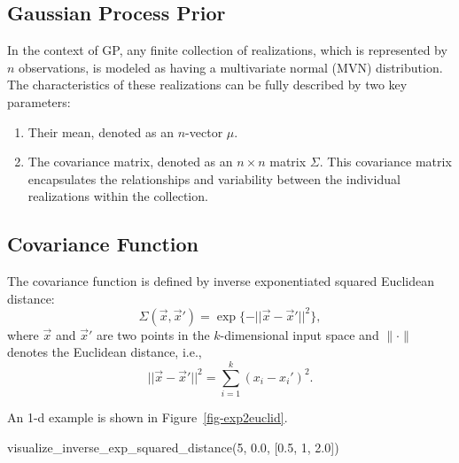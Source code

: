 \documentclass[
  letterpaper,
  DIV=11,
  numbers=noendperiod]{scrreprt}
\newenvironment{Shaded}{\begin{snugshade}}{\end{snugshade}}
\newcommand{\DecValTok}[1]{\textcolor[rgb]{0.68,0.00,0.00}{#1}}
\newcommand{\FloatTok}[1]{\textcolor[rgb]{0.68,0.00,0.00}{#1}}
\newcommand{\NormalTok}[1]{\textcolor[rgb]{0.00,0.23,0.31}{#1}}
\providecommand{\tightlist}{%
  \setlength{\itemsep}{0pt}\setlength{\parskip}{0pt}}\usepackage{longtable,booktabs,array}
\begin{document}
\subsection{Gaussian Process Prior}\label{gaussian-process-prior}

In the context of GP, any finite collection of realizations, which is
represented by \(n\) observations, is modeled as having a multivariate
normal (MVN) distribution. The characteristics of these realizations can
be fully described by two key parameters:

\begin{enumerate}
\def\labelenumi{\arabic{enumi}.}
\tightlist
\item
  Their mean, denoted as an \(n\)-vector \(\mu\).
\item
  The covariance matrix, denoted as an \(n \times n\) matrix \(\Sigma\).
  This covariance matrix encapsulates the relationships and variability
  between the individual realizations within the collection.
\end{enumerate}

\subsection{Covariance Function}\label{covariance-function}

The covariance function is defined by inverse exponentiated squared
Euclidean distance: \[
\Sigma(\vec{x}, \vec{x}') = \exp\{ - || \vec{x} - \vec{x}'||^2 \},
\] where \(\vec{x}\) and \(\vec{x}'\) are two points in the
\(k\)-dimensional input space and \(\| \cdot \|\) denotes the Euclidean
distance, i.e., \[
|| \vec{x} - \vec{x}'||^2 = \sum_{i=1}^k (x_i - x_i')^2.
\]

An 1-d example is shown in Figure~\ref{fig-exp2euclid}.

\begin{Shaded}
\begin{Highlighting}[]
\NormalTok{visualize\_inverse\_exp\_squared\_distance(}\DecValTok{5}\NormalTok{, }\FloatTok{0.0}\NormalTok{, [}\FloatTok{0.5}\NormalTok{, }\DecValTok{1}\NormalTok{, }\FloatTok{2.0}\NormalTok{])}
\end{Highlighting}
\end{Shaded}
\end{document}
